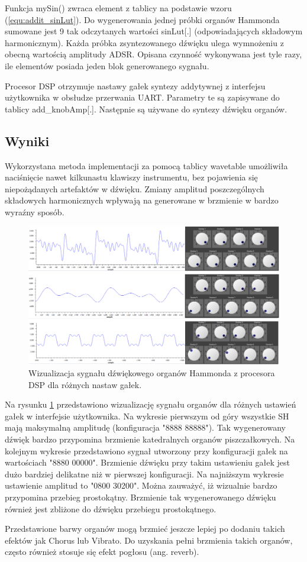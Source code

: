 Funkcja mySin() zwraca element z tablicy na podstawie wzoru (\ref{equ:addit_sinLut}). Do wygenerowania jednej próbki organów Hammonda sumowane jest 9 tak odczytanych wartości sinLut[.] (odpowiadających składowym harmonicznym). Każda próbka zsyntezowanego dźwięku ulega wymnożeniu z obecną wartością amplitudy ADSR. Opisana czynność wykonywana jest tyle razy, ile elementów posiada jeden blok generowanego sygnału.

Procesor DSP otrzymuje nastawy gałek syntezy addytywnej z interfejsu użytkownika w obsłudze przerwania UART. Parametry te są zapisywane do tablicy add\_knobAmp[.]. Następnie są używane do syntezy dźwięku organów.

\subsection{Wyniki}
Wykorzystana metoda implementacji za pomocą tablicy wavetable umożliwiła naciśnięcie nawet kilkunastu klawiszy instrumentu, bez pojawienia się niepożądanych artefaktów w dźwięku. Zmiany amplitud poszczególnych składowych harmonicznych wpływają na generowane w brzmienie w bardzo wyraźny sposób.

\begin{figure}[H]
	\centering
	\includegraphics[width=15cm]{grafiki/add_hammond_dsp}
	\captionsetup{justification=centering}
	\caption{Wizualizacja sygnału dźwiękowego organów Hammonda z procesora DSP dla różnych nastaw gałek.}
	\label{rys:add_hammond_dsp}
\end{figure}

Na rysunku \ref{rys:add_hammond_dsp} przedstawiono wizualizację sygnału organów dla różnych ustawień gałek w interfejsie użytkownika. Na wykresie pierwszym od góry wszystkie SH mają maksymalną amplitudę (konfiguracja "8888 88888"). Tak wygenerowany dźwięk bardzo przypomina brzmienie katedralnych organów piszczałkowych. Na kolejnym wykresie przedstawiono sygnał utworzony przy konfiguracji gałek na wartościach "8880 00000". Brzmienie dźwięku przy takim ustawieniu gałek jest dużo bardziej delikatne niż w pierwszej konfiguracji. Na najniższym wykresie ustawienie amplitud to "0800 30200". Można zauważyć, iż wizualnie bardzo przypomina przebieg prostokątny. Brzmienie tak wygenerowanego dźwięku również jest zbliżone do dźwięku przebiegu prostokątnego.

Przedstawione barwy organów mogą brzmieć jeszcze lepiej po dodaniu takich efektów jak Chorus lub Vibrato. Do uzyskania pełni brzmienia takich organów, często również stosuje się efekt pogłosu (ang. reverb).